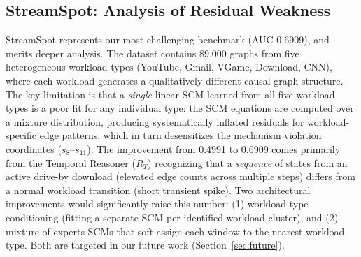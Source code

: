 \subsection{StreamSpot: Analysis of Residual Weakness}
StreamSpot represents our most challenging benchmark (AUC 0.6909), and merits deeper analysis. The dataset contains 89,000 graphs from five heterogeneous workload types (YouTube, Gmail, VGame, Download, CNN), where each workload generates a qualitatively different causal graph structure. The key limitation is that a \emph{single} linear SCM learned from all five workload types is a poor fit for any individual type: the SCM equations are computed over a mixture distribution, producing systematically inflated residuals for workload-specific edge patterns, which in turn desensitizes the mechanism violation coordinates ($s_8$--$s_{11}$). The improvement from 0.4991 to 0.6909 comes primarily from the Temporal Reasoner ($R_T$) recognizing that a \emph{sequence} of states from an active drive-by download (elevated edge counts across multiple steps) differs from a normal workload transition (short transient spike). Two architectural improvements would significantly raise this number: (1) workload-type conditioning (fitting a separate SCM per identified workload cluster), and (2) mixture-of-experts SCMs that soft-assign each window to the nearest workload type. Both are targeted in our future work (Section~\ref{sec:future}).

